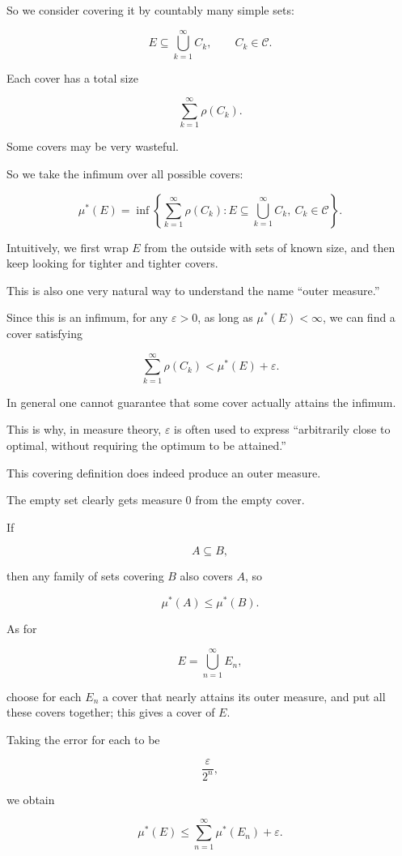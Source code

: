 \documentclass[11pt]{article}
\begin{document}
So we consider covering it by countably many simple sets:

\[
E\subseteq\bigcup_{k=1}^{\infty}C_{k},\qquad C_{k}\in\mathcal{C}.
\]

Each cover has a total size

\[
\sum_{k=1}^{\infty}\rho(C_{k}).
\]

Some covers may be very wasteful.

So we take the infimum over all possible covers:

\[
\mu^{*}(E)=\inf\left\{\sum_{k=1}^{\infty}\rho(C_{k}):E\subseteq\bigcup_{k=1}^{\infty}C_{k},\ C_{k}\in\mathcal{C}\right\}.
\]

Intuitively, we first wrap $E$ from the outside with sets of known size, and then keep looking for tighter and tighter covers.

This is also one very natural way to understand the name ``outer measure.''

Since this is an infimum, for any $\varepsilon>0$, as long as $\mu^{*}(E)<\infty$, we can find a cover satisfying

\[
\sum_{k=1}^{\infty}\rho(C_{k})<\mu^{*}(E)+\varepsilon.
\]

In general one cannot guarantee that some cover actually attains the infimum.

This is why, in measure theory, $\varepsilon$ is often used to express ``arbitrarily close to optimal, without requiring the optimum to be attained.''

This covering definition does indeed produce an outer measure.

The empty set clearly gets measure $0$ from the empty cover.

If

\[
A\subseteq B,
\]

then any family of sets covering $B$ also covers $A$, so

\[
\mu^{*}(A)\leq\mu^{*}(B).
\]

As for

\[
E=\bigcup_{n=1}^{\infty}E_{n},
\]

choose for each $E_{n}$ a cover that nearly attains its outer measure, and put all these covers together; this gives a cover of $E$.

Taking the error for each to be

\[
\frac{\varepsilon}{2^{n}},
\]

we obtain

\[
\mu^{*}(E)\leq\sum_{n=1}^{\infty}\mu^{*}(E_{n})+\varepsilon.
\]
\end{document}
